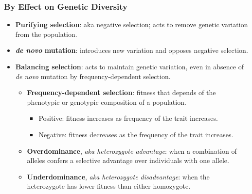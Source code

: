 \documentclass[12pt,a4paper]{article}
\begin{document}
\begin{itemize}
    \subsubsection{By Effect on Genetic Diversity}
    \begin{itemize}
        \item \textbf{Purifying selection}: aka negative selection; acts to remove genetic variation from the population.
        \item \textbf{\textit{de novo} mutation}: introduces new variation and opposes negative selection.
        \item \textbf{Balancing selection}: acts to maintain genetic variation, even in absence of \textit{de novo} mutation by frequency-dependent selection.
            \begin{itemize}
                \item \textbf{Frequency-dependent selection}: fitness that depends of the phenotypic or genotypic {\color{o-Sun}composition} of a population.
                    \begin{itemize}
                        \item {\color{pos}Positive}: fitness {\color{pos}increases} as frequency of the trait {\color{pos}increases}.
                        \item {\color{neg}Negative}: fitness {\color{neg}decreases} as the frequency of the trait {\color{pos}increases}.
                    \end{itemize}
                \item \textbf{Overdominance}, \textit{aka heterozygote advantage}: when a combination of alleles confers a selective advantage over individuals with one allele.
                \item \textbf{Underdominance}, \textit{aka heterozygote disadvantage}: when the heterozygote has lower fitness than either homozygote. 
            \end{itemize}
    \end{itemize}

\end{itemize}
\end{document}
